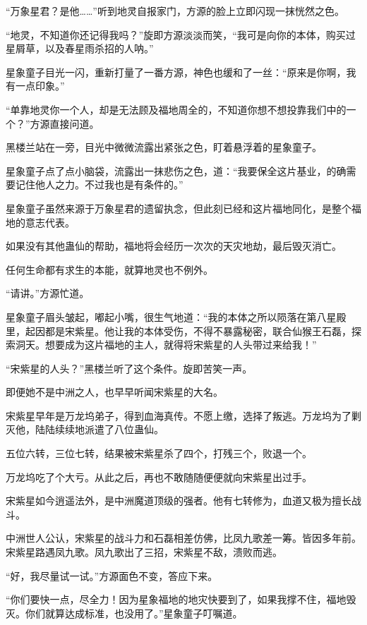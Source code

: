 
\begin{this_body}



“万象星君？是他……”听到地灵自报家门，方源的脸上立即闪现一抹恍然之色。

“地灵，不知道你还记得我吗？”旋即方源淡淡而笑，“我可是向你的本体，购买过星屑草，以及春星雨杀招的人呐。”

星象童子目光一闪，重新打量了一番方源，神色也缓和了一丝：“原来是你啊，我有一点印象。”

“单靠地灵你一个人，却是无法顾及福地周全的，不知道你想不想投靠我们中的一个？”方源直接问道。

黑楼兰站在一旁，目光中微微流露出紧张之色，盯着悬浮着的星象童子。

星象童子点了点小脑袋，流露出一抹悲伤之色，道：“我要保全这片基业，的确需要记住他人之力。不过我也是有条件的。”

星象童子虽然来源于万象星君的遗留执念，但此刻已经和这片福地同化，是整个福地的意志代表。

如果没有其他蛊仙的帮助，福地将会经历一次次的天灾地劫，最后毁灭消亡。

任何生命都有求生的本能，就算地灵也不例外。

“请讲。”方源忙道。

星象童子眉头皱起，嘟起小嘴，很生气地道：“我的本体之所以陨落在第八星殿里，起因都是宋紫星。他让我的本体受伤，不得不暴露秘密，联合仙猴王石磊，探索洞天。想要成为这片福地的主人，就得将宋紫星的人头带过来给我！”

“宋紫星的人头？”黑楼兰听了这个条件。旋即苦笑一声。

即便她不是中洲之人，也早早听闻宋紫星的大名。

宋紫星早年是万龙坞弟子，得到血海真传。不愿上缴，选择了叛逃。万龙坞为了剿灭他，陆陆续续地派遣了八位蛊仙。

五位六转，三位七转，结果被宋紫星杀了四个，打残三个，败退一个。

万龙坞吃了个大亏。从此之后，再也不敢随随便便就向宋紫星出过手。

宋紫星如今逍遥法外，是中洲魔道顶级的强者。他有七转修为，血道又极为擅长战斗。

中洲世人公认，宋紫星的战斗力和石磊相差仿佛，比凤九歌差一筹。皆因多年前。宋紫星路遇凤九歌。凤九歌出了三招，宋紫星不敌，溃败而逃。

“好，我尽量试一试。”方源面色不变，答应下来。

“你们要快一点，尽全力！因为星象福地的地灾快要到了，如果我撑不住，福地毁灭。你们就算达成标准，也没用了。”星象童子叮嘱道。


\end{this_body}
